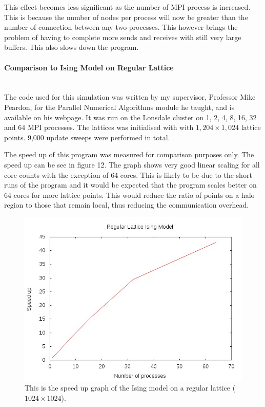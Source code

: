 \documentclass[pdftex,12pt,a4paper]{article}
\begin{document}
This effect becomes less significant as the number of MPI process is increased. This is because the number of nodes per process will now be greater than the number of connection between any two processes. This however brings the problem of having to complete more sends and receives with still very large buffers. This also slows down the program.



\paragraph{Comparison to Ising Model on Regular Lattice} ~\\

The code used for this simulation was written by my supervisor, Professor Mike Peardon, for the Parallel Numerical Algorithms module he taught, and is available on his webpage. It was run on the Lonsdale cluster on 1, 2, 4, 8, 16, 32 and 64 MPI processes. The lattices was initialised with with $1,204 \times 1,024$ lattice points. 9,000 update sweeps were performed in total.

The speed up of this program was measured for comparison purposes only. The speed up can be see in figure 12. The graph shows very good linear scaling for all core counts with the exception of 64 cores. This is likely to be due to the short runs of the program and it would be expected that the program scales better on 64 cores for more lattice points. This would reduce the ratio of points on a halo region to those that remain local, thus reducing the communication overhead.

\begin{figure}
\centering
\includegraphics[scale=0.8]{ising_graph.jpg}
\caption{This is the speed up graph of the Ising model on a regular lattice ($1024 \times 1024$).}
\end{figure}
\end{document}
